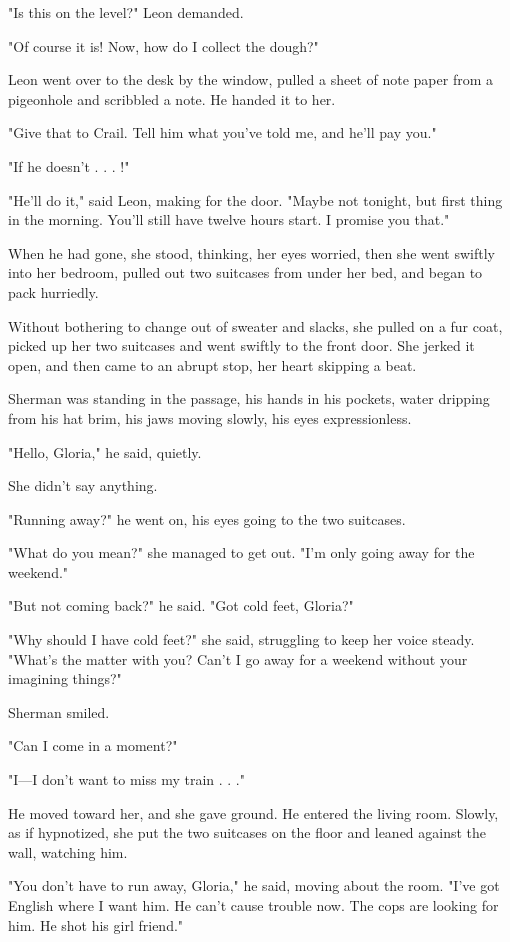 \documentclass{novel}
\begin{document}
"Is this on the level?" Leon demanded.

"Of course it is! Now\*, how do I collect the dough?"

Leon went over to the desk by the window, pulled a sheet of note paper from a pigeonhole and scribbled a note. He handed it to her.

"Give that to Crail. Tell him what you've told me, and he'll pay you."

"If he doesn't . . . !"

"He'll do it," said Leon, making for the door. "Maybe not tonight, but first thing in the morning. You'll still have twelve hours start. I promise you that."

When he had gone, she stood, thinking, her eyes worried, then she went swiftly into her bedroom, pulled out two suitcases from under her bed, and began to pack hurriedly.

Without bothering to change out of sweater and slacks, she pulled on a fur coat, picked up her two suitcases and went swiftly to the front door. She jerked it open, and then came to an abrupt stop, her heart skipping a beat.

Sherman was standing in the passage, his hands in his pockets, water dripping from his hat brim, his jaws moving slowly, his eyes expressionless.

"Hello, Gloria," he said, quietly.

She didn't say anything.

"Running away?" he went on, his eyes going to the two suitcases.

"What do you mean?" she managed to get out. "I'm only going away for the weekend."

"But not coming back?" he said. "Got cold feet, Gloria?"

"Why should I have cold feet?" she said, struggling to keep her voice steady. "What's the matter with you? Can't I go away for a weekend without your imagining things?"

Sherman smiled.

"Can I come in a moment?"

"I—I don't want to miss my train . . ."

He moved toward her, and she gave ground. He entered the living room. Slowly, as if hypnotized, she put the two suitcases on the floor and leaned against the wall, watching him.

"You don't have to run away, Gloria," he said, moving about the room. "I've got English where I want him. He can't cause trouble now. The cops are looking for him. He shot his girl friend."
\end{document}
